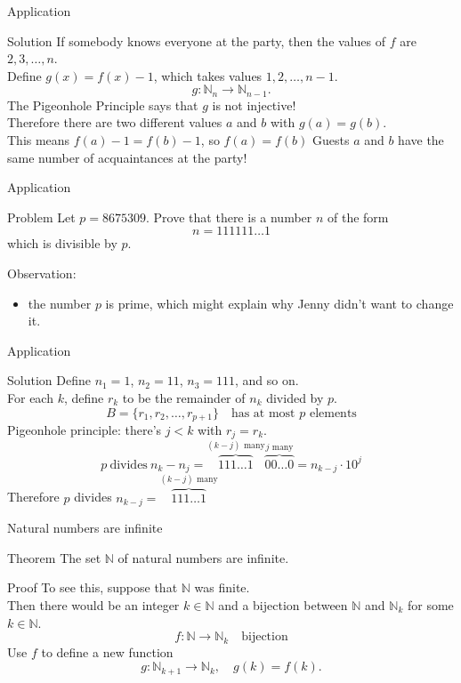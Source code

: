 \documentclass{beamer}
\begin{document}
\begin{frame}{Application}
\begin{block}{Solution}
\pause
If somebody knows everyone at the party, then the values of $f$ are $2,3,\dots, n$.\\
\pause
Define $g(x) = f(x)-1$, which takes values $1,2,\dots, n-1$.\\
\pause
$$g: \mathbb N_n\rightarrow\mathbb N_{n-1}.$$
\pause
The Pigeonhole Principle says that $g$ is not injective!\\
\pause
Therefore there are two different values $a$ and $b$ with $g(a) = g(b)$.\\
\pause
This means $f(a)-1=f(b)-1$, so $f(a) = f(b)$
\pause
Guests $a$ and $b$ have the same number of acquaintances at the party!
\end{block}
\end{frame}

\begin{frame}{Application}
\begin{block}{Problem}
Let $p=8675309$.  Prove that there is a number $n$ of the form 
$$n = 111111\dots 1$$
which is divisible by $p$.
\end{block}
\pause
Observation:
\begin{itemize}
\pause
\item the number $p$ is prime, which might explain why Jenny didn't want to change it.
\end{itemize}
\end{frame}

\begin{frame}{Application}
\pause
\begin{block}{Solution}
Define $n_1 = 1$, $n_2 = 11$, $n_3 = 111$, and so on.\\
For each $k$, define $r_k$ to be the remainder of $n_k$ divided by $p$.
\pause
$$B = \{r_1,r_2,\dots, r_{p+1}\}\quad\text{has at most $p$ elements}$$
\pause
Pigeonhole principle: there's $j < k$ with $r_j = r_k$.\\
\pause
$$p\ \text{divides}\ n_k-n_j = \overbrace{111\dots 1}^{\text{$(k-j)$ many}}\overbrace{00\dots 0}^{\text{$j$ many}} = n_{k-j}\cdot10^{j}$$
\pause
Therefore $p$ divides $n_{k-j} = \overbrace{111\dots 1}^{\text{$(k-j)$ many}}$
\end{block}
\end{frame}

\begin{frame}{Natural numbers are infinite}
\pause
\begin{block}{Theorem}
The set $\mathbb N$ of natural numbers are infinite.
\end{block}
\pause
\begin{block}{Proof}
To see this, suppose that $\mathbb N$ was finite.\\
\pause
Then there would be an integer $k\in\mathbb N$ and a bijection between $\mathbb N$ and $\mathbb N_k$ for some $k\in\mathbb N$.
\pause
$$f: \mathbb N\rightarrow\mathbb N_k\quad\text{bijection}$$
\pause
Use $f$ to define a new function
$$g: \mathbb N_{k+1}\rightarrow\mathbb N_k,\quad g(k) = f(k).$$
\end{block}
\end{frame}
\end{document}
